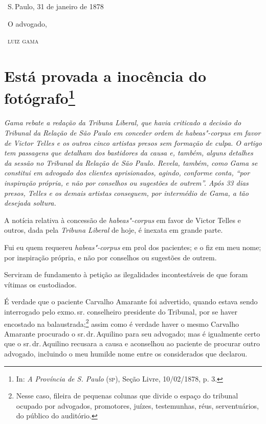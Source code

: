 \bigskip

\hfill\ S.\,Paulo, 31 de janeiro de 1878\smallskip

\hfill\ O advogado, 

\hfill\ \textsc{luiz gama}

\chapter{Está provada a inocência do fotógrafo\footnote[*]{In: \emph{A Província de S.
  Paulo} (\textsc{sp}), Seção Livre, 10/02/1878, p. 3.}}

\begin{flushleft}
{\footnotesize\itshape
Gama rebate a redação da Tribuna
Liberal, que havia criticado a decisão do Tribunal da Relação de São
Paulo em conceder ordem de \emph{habeas"-corpus} em favor de Victor
Telles e os outros cinco artistas presos sem formação de culpa. O artigo
tem passagens que detalham dos bastidores da causa e, também, alguns
detalhes da sessão no Tribunal da Relação de São Paulo. Revela, também,
como Gama se constitui em advogado dos clientes aprisionados, agindo,
conforme conta, ``por inspiração própria, e não por conselhos ou
sugestões de outrem''. Após 33 dias presos, Telles e os demais artistas
conseguem, por intermédio de Gama, a tão desejada soltura. }
\end{flushleft}

A notícia relativa à concessão de \emph{habeas"-corpus} em favor de
Victor Telles e outros, dada pela \emph{Tribuna Liberal} de hoje, é
inexata em grande parte.

Fui eu quem requereu \emph{habeas"-corpus} em prol dos pacientes; e o fiz
em meu nome; por inspiração própria, e não por conselhos ou sugestões de
outrem.

Serviram de fundamento à petição as ilegalidades incontestáveis de que
foram vítimas os custodiados.

É verdade que o paciente Carvalho Amarante foi advertido, quando estava
sendo interrogado pelo exmo.\,sr. conselheiro presidente do Tribunal, por
se haver encostado na balaustrada;\footnote{Nesse caso, fileira de
  pequenas colunas que divide o espaço do tribunal ocupado por
  advogados, promotores, juízes, testemunhas, réus, serventuários, do
  público do auditório.} assim como é verdade haver o mesmo Carvalho
Amarante procurado o sr.\,dr.\,Aquilino para seu advogado; mas é
igualmente certo que o sr.\,dr.\,Aquilino recusara a causa e aconselhou ao
paciente de procurar outro advogado, incluindo o meu humilde nome entre
os considerados que declarou.

